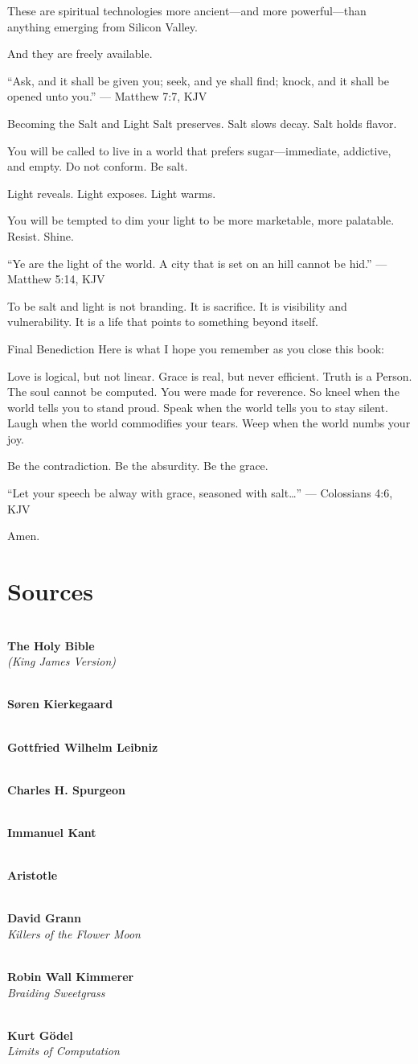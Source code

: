 \documentclass[a4paper,11pt]{book}
\begin{document}
These are spiritual technologies more ancient—and more powerful—than anything emerging from Silicon Valley.

And they are freely available.

“Ask, and it shall be given you; seek, and ye shall find; knock, and it shall be opened unto you.” — Matthew 7:7, KJV

Becoming the Salt and Light
Salt preserves. Salt slows decay. Salt holds flavor.

You will be called to live in a world that prefers sugar—immediate, addictive, and empty. Do not conform. Be salt.

Light reveals. Light exposes. Light warms.

You will be tempted to dim your light to be more marketable, more palatable. Resist. Shine.

“Ye are the light of the world. A city that is set on an hill cannot be hid.” — Matthew 5:14, KJV

To be salt and light is not branding. It is sacrifice. It is visibility and vulnerability. It is a life that points to something beyond itself.

Final Benediction
Here is what I hope you remember as you close this book:

Love is logical, but not linear.
Grace is real, but never efficient.
Truth is a Person.
The soul cannot be computed.
You were made for reverence.
So kneel when the world tells you to stand proud. Speak when the world tells you to stay silent. Laugh when the world commodifies your tears. Weep when the world numbs your joy.

Be the contradiction. Be the absurdity. Be the grace.

“Let your speech be alway with grace, seasoned with salt…” — Colossians 4:6, KJV

Amen.

\chapter*{Sources}

\textbf{\\The Holy Bible\\}
\textit{(King James Version)}

\textbf{\\Søren Kierkegaard\\}

\textbf{\\Gottfried Wilhelm Leibniz\\}

\textbf{\\Charles H. Spurgeon\\}

\textbf{\\Immanuel Kant\\}

\textbf{\\Aristotle\\}

\textbf{\\David Grann\\}
\textit{Killers of the Flower Moon}

\textbf{\\Robin Wall Kimmerer\\}
\textit{Braiding Sweetgrass}

\textbf{\\Kurt Gödel\\}
\textit{Limits of Computation}
\end{document}

